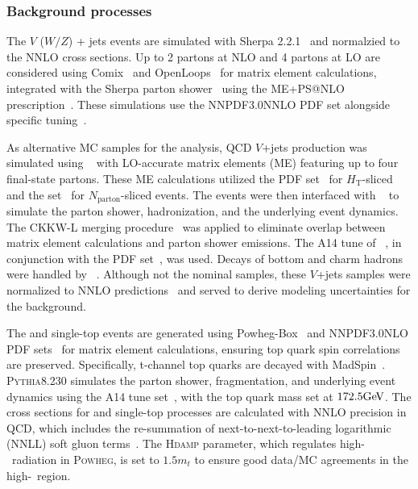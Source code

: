 \subsubsection{Background processes}
The $V$ ($W/Z$) + jets events are simulated with Sherpa 2.2.1~\cite{Gleisberg:2008ta} and normalzied to the NNLO cross sections. 
Up to 2 partons at NLO and 4 partons at LO are considered using Comix~\cite{Gleisberg:2008fv} and OpenLoops~\cite{Cascioli:2011va} for matrix element calculations, integrated with the Sherpa parton shower~\cite{Schumann:2007mg} using the ME+PS@NLO prescription~\cite{Hoeche:2012yf}. 
These simulations use the NNPDF3.0NNLO PDF set alongside specific tuning~\cite{Ball_2015}. 

As alternative \Vjets MC samples for the analysis, QCD $V$+jets production was simulated using \MGNLO[2.2.2]~\cite{Alwall:2014hca} with LO-accurate matrix elements (ME) featuring up to four final-state partons. 
These ME calculations utilized the \NNPDF[3.0nlo] PDF set~\cite{Ball:2014uwa} for $H_\text{T}$-sliced and the \NNPDF[2.3lo] set~\cite{Ball:2012cx} for $N_\text{parton}$-sliced events. 
The events were then interfaced with \PYTHIA[8.186]~\cite{Sjostrand:2007gs} to simulate the parton shower, hadronization, and the underlying event dynamics.
The CKKW-L merging procedure~\cite{Lonnblad:2001iq,Lonnblad:2011xx} was applied to eliminate overlap between matrix element calculations and parton shower emissions.
The A14 tune of \PYTHIA[8]~\cite{ATL-PHYS-PUB-2014-021}, in conjunction with the \NNPDF[2.3lo] PDF set~\cite{Ball:2012cx}, was used. 
Decays of bottom and charm hadrons were handled by \EVTGEN[1.2.0]~\cite{Lange:2001uf}. 
Although not the nominal samples, these $V$+jets samples were normalized to NNLO predictions~\cite{Anastasiou:2003ds} and served to derive modeling uncertainties for the \Vjets background.

The \ttbar and single-top events are generated using Powheg-Box~\cite{Alioli:2010xd} and NNPDF3.0NLO PDF sets~\cite{Ball:2014uwa} for matrix element calculations, ensuring top quark spin correlations are preserved. 
Specifically, t-channel top quarks are decayed with MadSpin~\cite{Artoisenet:2012st}. 
\textsc{Pythia}8.230 simulates the parton shower, fragmentation, and underlying event dynamics using the A14 tune set~\cite{ATL-PHYS-PUB-2014-021}, with the top quark mass set at $172.5\text{Ge\kern -0.1em V}$. 
The cross sections for \ttbar and single-top processes are calculated with NNLO precision in QCD, which includes the re-summation of next-to-next-to-leading logarithmic (NNLL) soft gluon terms~\cite{Czakon:2011xx,Kidonakis:2011wy,Kidonakis:2010tc,Kidonakis:2010ux}.
The \textsc{Hdamp} parameter, which regulates high-\pt\ radiation in \textsc{Powheg}, is set to $1.5m_{t}$ to ensure good data/MC agreements in the high-\pt\ region\cite{ATL-PHYS-PUB-2016-020}.

